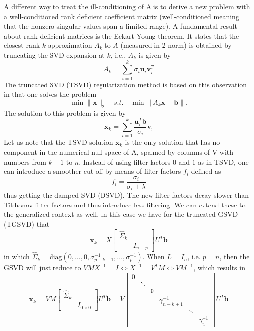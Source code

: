 \documentclass{article}
\newcommand{\mbf}[1]{\mathbf{#1}}
\begin{document}
	A different way to treat the ill-conditioning of A is to derive a new problem with a well-conditioned rank deficient coefficient matrix (well-conditioned meaning that the nonzero singular values span a limited range). A fundamental result about rank deficient matrices is the Eckart-Young theorem. It states that the closest rank-$k$ approximation $A_k$ to $A$ (measured in 2-norm) is obtained
	by truncating the SVD expansion at $k$, i.e., $A_k$ is given by
	$$A_k=\sum_{i=1}^k\sigma_i\mbf{u}_i\mbf{v}_i^{T}$$
	The truncated SVD (TSVD) regularization method is based on this observation in that one solves the
	problem
	$$\min\|\mbf{x}\|_2\quad s.t. \quad \min\|A_k\mbf{x}-\mbf{b}\|.$$
	The solution to this problem is given by
	\begin{equation}\label{eq:TSVD-sol}
		\mbf{x}_k=\sum_{i=1}^{k}\frac{\mbf{u}_i^T\mbf{b}}{\sigma_i}\mbf{v}_i
	\end{equation}
	Let us note that the TSVD solution $\mbf{x}_k$ is the only solution that has no component in the numerical
	null-space of A, spanned by columns of V with numbers from $k + 1$ to $n$.
	Instead of using filter factors $0$ and $1$ as in TSVD, one can introduce a smoother cut-off by means
	of filter factors $f_i$ defined as
	$$f_i=\frac{\sigma_i}{\sigma_i+\lambda}$$
	thus getting the damped SVD (DSVD). The new filter factors decay slower than Tikhonov filter factors
	and thus introduce less filtering.
	We can extend these to the generalized context as well. In this case we have for the truncated
	GSVD (TGSVD) that
	\begin{equation}\label{eq:TGSVD-sol}
			\mbf{x}_k=X\begin{bmatrix}
			\hat{\Sigma}_k&\\
			&I_{n-p}
		\end{bmatrix}
		U^{T}\mbf{b}
	\end{equation}
	in which $\hat{\Sigma}_k=\text{diag}(0,\ldots,0,\sigma^{-1}_{p-k+1},\ldots,\sigma^{-1}_p)$.
	When $L=I_{n}$, i.e. $p=n$, then the GSVD will just reduce to $VMX^{-1} = I \Leftrightarrow X^{-1} = V^T M \Leftrightarrow V M^{-1} $, which results in 
	\begin{equation}\label{eq:TGSVD-sol-LeqI}
		\textbf{x}_k = V M \begin{bmatrix}
			\hat{\Sigma}_k & \\ & I_{0\times 0}
		\end{bmatrix}U^T \textbf{b} = V
		\begin{bmatrix}
			0 & & & & &  \\& \ddots& & & &  \\ & &0 & & &  \\
			& & & \gamma_{n-k+1}^{-1} & & \\& & & & \ddots& \\& & & & &\gamma_{n}^{-1}
		\end{bmatrix}U^T \textbf{b}
	\end{equation}
\end{document}
